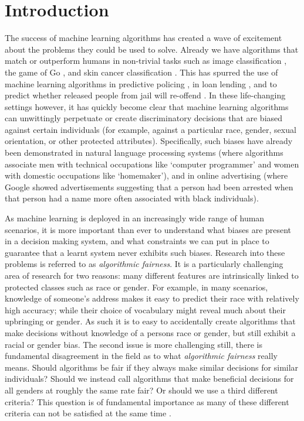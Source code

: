 \documentclass{article}
\begin{document}
\section{Introduction}
The success of machine learning algorithms has created a wave of excitement
about the problems they could be used to solve. Already we have algorithms that
match or outperform humans in non-trivial tasks such as image classification \citep{he2015delving}, the game of Go \citep{silver2016mastering}, and skin cancer classification \citep{esteva2017dermatologist}. This has spurred the use of machine learning algorithms in predictive policing \citep{lum2016predict}, in loan lending
\citep{hardt2016equality}, and to predict whether released people from jail will
re-offend \citep{chouldechova2017fair}. In these life-changing settings however,
it has quickly become clear that machine learning algorithms can unwittingly
perpetuate or create discriminatory decisions that are biased against certain individuals (for example, against a particular race, gender, sexual
orientation, or other protected attributes). Specifically, such biases have already been
demonstrated in natural language processing systems
\citep{bolukbasi2016man} (where algorithms associate men with technical
occupations like `computer programmer' and women with domestic occupations like
`homemaker'), and in online advertising \citep{sweeney2013discrimination} (where
Google showed advertisements suggesting that a person had been arrested when
that person had a name more often associated with black individuals).

As machine learning is deployed in an increasingly wide range of human 
scenarios, it is more important than ever to understand what biases are present
in a decision making system, and what constraints we can put in place to
guarantee that a learnt system never exhibits such biases. Research into these
problems is referred to as \emph{algorithmic fairness}. It is a particularly
challenging area of research for two reasons: many different features are
intrinsically linked to protected classes such as race or gender. For example, in many
scenarios, knowledge of someone's address makes it easy to predict their race
with relatively high accuracy; while their choice of vocabulary might reveal much
about their upbringing or gender. As such it is to easy to accidentally create algorithms that
make decisions without knowledge of a persons race or gender, but still
exhibit a racial or gender bias.  The second issue is more challenging still,
there is fundamental disagreement in the field as to what \emph{algorithmic
  fairness} really means. 
Should algorithms be fair if they always make similar decisions for similar individuals?
Should we
instead call algorithms that make beneficial decisions for all genders at roughly the same
rate fair? Or should we use a third different criteria? This question is of
fundamental importance as many of these different criteria can not be satisfied
at the same time \cite{kleinberg2016inherent}.
\end{document}
